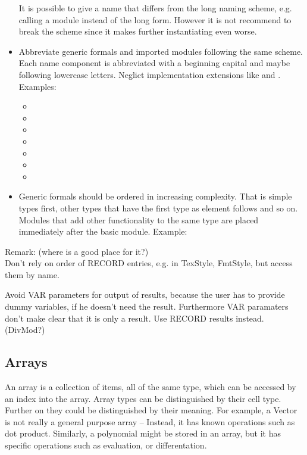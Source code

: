 \begin{itemize}
It is possible to give a name that differs from
the long naming scheme,
e.g. calling a module 
instead of the long form.
However it is not recommend to break the scheme
since it makes further instantiating even worse.
\item Abbreviate generic formals and imported modules following the same scheme.
Each name component is abbreviated with a beginning capital and
maybe following lowercase letters.
Neglict implementation extensions like  and .
Examples:
\begin{itemize}
\item {}
\item {}
\item {}
\item {}
\item {}
\item {}
\item {}
\end{itemize}
\item Generic formals should be ordered in increasing complexity.
That is simple types first,
other types that have the first type as element follows and so on.
Modules that add other functionality to the same type
are placed immediately after the basic module.
Example:
\end{itemize}

Remark: (where is a good place for it?)\\
Don't rely on order of RECORD entries,
e.g. in TexStyle, FmtStyle,
but access them by name.

Avoid VAR parameters for output of results,
because the user has to provide dummy variables,
if he doesn't need the result.
Furthermore VAR paramaters don't make clear
that it is only a result.
Use RECORD results instead.
(DivMod?)

\subsection{Arrays}
An array is a collection of items, all of the same type,
which can be accessed by an index into the array.
Array types can be distinguished by their cell type.
Further on they could be distinguished by their meaning.
For example, a Vector is not really a general purpose array --
Instead, it has known operations such as dot product.
Similarly, a polynomial might be stored in an array,
but it has specific operations such as evaluation,
or differentation.

